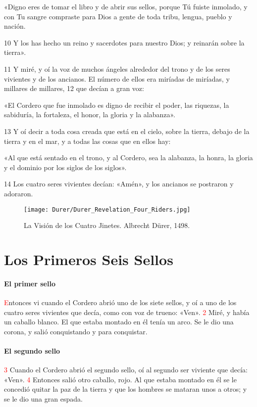 \documentclass[12pt,twocolumn,twoside]{book}
\newcommand{\vnum}[1]{\textcolor{red}{\normalsize{#1}}}
\begin{document}
«Digno eres de tomar el libro y de abrir sus sellos, porque Tú fuiste inmolado, y con Tu sangre compraste para Dios a gente de toda tribu, lengua, pueblo y nación.

10 Y los has hecho un reino y sacerdotes para nuestro Dios; y reinarán sobre la tierra».

11 Y miré, y oí la voz de muchos ángeles alrededor del trono y de los seres vivientes y de los ancianos. El número de ellos era miríadas de miríadas, y millares de millares, 12 que decían a gran voz:

«El Cordero que fue inmolado es digno de recibir el poder, las riquezas, la sabiduría, la fortaleza, el honor, la gloria y la alabanza».

13 Y oí decir a toda cosa creada que está en el cielo, sobre la tierra, debajo de la tierra y en el mar, y a todas las cosas que en ellos hay:

«Al que está sentado en el trono, y al Cordero, sea la alabanza, la honra, la gloria y el dominio por los siglos de los siglos».

14 Los cuatro seres vivientes decían: «Amén», y los ancianos se postraron y adoraron.
\begin{figure*}[p!]
	\centering
       \texttt{[image: Durer/Durer\_Revelation\_Four\_Riders.jpg]}    
    	\caption{La Visión de los Cuatro Jinetes. Albrecht Dürer, 1498.}
\end{figure*}
\chapter{Los Primeros Seis Sellos}
\subsubsection*{El primer sello}
\lettrine[lines=4]{\textcolor{red}{E}}{}ntonces vi cuando el Cordero abrió uno de los siete sellos, y oí a uno de los cuatro seres vivientes que decía, como con voz de trueno: «Ven». \vnum{2} Miré, y había un caballo blanco. El que estaba montado en él tenía un arco. Se le dio una corona, y salió conquistando y para conquistar.
\subsubsection*{El segundo sello}
\vnum{3} Cuando el Cordero abrió el segundo sello, oí al segundo ser viviente que decía: «Ven». \vnum{4} Entonces salió otro caballo, rojo. Al que estaba montado en él se le concedió quitar la paz de la tierra y que los hombres se mataran unos a otros; y se le dio una gran espada.
\end{document}
